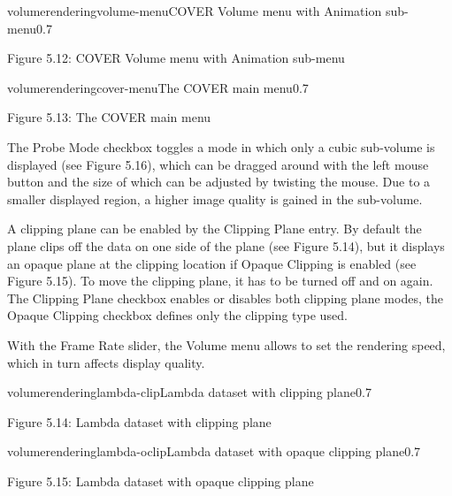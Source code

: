 \begin{covimg}{volumerendering}{volume-menu}{COVER Volume menu with Animation sub-menu}{0.7}\end{covimg}
\begin{htmlonly}
Figure 5.12: COVER Volume menu with Animation sub-menu
\vspace{0.5cm}
\end{htmlonly}

\begin{covimg}{volumerendering}{cover-menu}{The COVER main menu}{0.7}\end{covimg}
\begin{htmlonly}
Figure 5.13: The COVER main menu
\vspace{0.5cm}
\end{htmlonly}

\clearpage

The Probe Mode checkbox toggles a mode in which only a cubic sub-volume is displayed (see Figure 5.16), 
which can be dragged around with the left mouse button and the size of which can be adjusted by twisting the mouse. 
Due to a smaller displayed region, a higher image quality is gained in the sub-volume.

A clipping plane can be enabled by the Clipping Plane entry. By default the plane clips off the data on one 
side of the plane (see Figure 5.14), but it displays an opaque plane at the clipping location if Opaque Clipping 
is enabled (see Figure 5.15). To move the clipping plane, it has to be turned off and on again. The Clipping Plane
checkbox enables or disables both clipping plane modes, the Opaque Clipping checkbox defines only the clipping type used.

With the Frame Rate slider, the Volume menu allows to set the rendering speed, which in turn affects display quality. 

\begin{covimg}{volumerendering}{lambda-clip}{Lambda dataset with clipping plane}{0.7}\end{covimg}
\begin{htmlonly}
Figure 5.14: Lambda dataset with clipping plane
\vspace{0.5cm}
\end{htmlonly}

\begin{covimg}{volumerendering}{lambda-oclip}{Lambda dataset with opaque clipping plane}{0.7}\end{covimg}
\begin{htmlonly}
Figure 5.15: Lambda dataset with opaque clipping plane 
\vspace{0.5cm}
\end{htmlonly}

